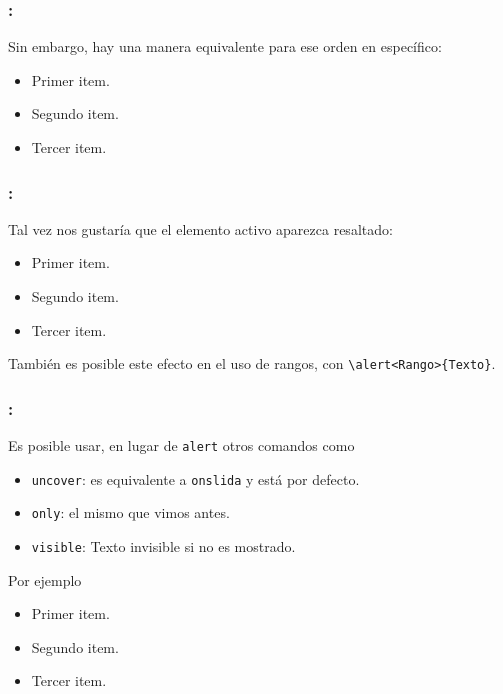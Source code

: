 \documentclass[11pt]{beamer}	%
\begin{document}
\begin{frame}
	\frametitle{\secname : \subsecname}
	
	Sin embargo, hay una manera equivalente para ese orden en específico:
		\begin{block}{}
		\begin{itemize}[<+->]
			\item Primer item.
			\item Segundo item.
			\item Tercer item.
		\end{itemize}
		\end{block}
\end{frame}

\begin{frame}
	
	\frametitle{\secname : \subsecname}
	
	Tal vez nos gustaría que el elemento activo aparezca resaltado:
		\begin{block}{}
		\begin{itemize}[<+- | alert@+>]
			\item Primer item.
			\item Segundo item.
			\item Tercer item.
		\end{itemize}
		\end{block}\vfill
	
	También es posible este efecto en el uso de rangos, con \texttt{\textbackslash alert<Rango>\{Texto\}}.
\end{frame}

\begin{frame}
	\frametitle{\secname : \subsecname}
	
	\begin{block}{}
	Es posible usar, en lugar de \texttt{alert} otros comandos como
		\begin{itemize}
			\item \texttt{uncover}: es equivalente a \texttt{onslida} y está por defecto.
			\item \texttt{only}: el mismo que vimos antes.
			\item \texttt{visible}: Texto invisible si no es mostrado.
		\end{itemize}
	\end{block}\vfill
	
	Por ejemplo
		\begin{itemize}[<+- | only@+>]
			\item Primer item.
			\item Segundo item.
			\item Tercer item.
		\end{itemize}
\end{frame}
\end{document}
